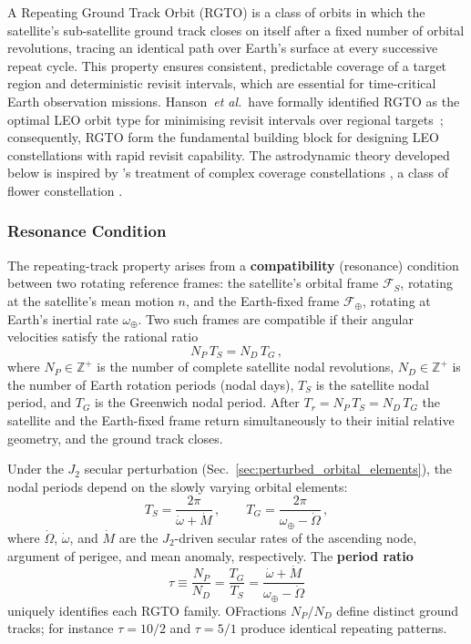 A Repeating Ground Track Orbit (RGTO) is a class of orbits in which the satellite's sub-satellite ground track closes on itself after a fixed number of orbital revolutions, tracing an identical path over Earth's surface at every successive repeat cycle.  This property ensures consistent, predictable coverage of a target region and deterministic revisit intervals, which are essential for time-critical Earth observation missions.  Hanson~\textit{et al.}\ have formally identified RGTO as the optimal LEO orbit type for minimising revisit intervals over regional targets~\cite{hansonDesigningGoodPartial1990}; consequently, RGTO form the fundamental building block for designing LEO constellations with rapid revisit capability.  The astrodynamic theory developed below is inspired by \citeauthor{lee_satellite_2020}'s treatment of complex coverage constellations \cite{lee_satellite_2020}, a class of flower constellation \cite{mortariFlowerConstellationSet2008}.

\subsubsection{Resonance Condition}
\label{sec:rgto_resonance_condition}

The repeating-track property arises from a \textbf{compatibility} (resonance) condition between two rotating reference frames: the satellite's orbital frame $\mathcal{F}_S$, rotating at the satellite's mean motion $n$, and the Earth-fixed frame $\mathcal{F}_{\oplus}$, rotating at Earth's inertial rate $\omega_{\oplus}$.  Two such frames are compatible if their angular velocities satisfy the rational ratio
\begin{equation}
    N_P \, T_S = N_D \, T_G \,,
    \label{eq:rgto_compatibility}
\end{equation}
where $N_P \in \mathbb{Z}^+$ is the number of complete satellite nodal revolutions, $N_D \in \mathbb{Z}^+$ is the number of Earth rotation periods (nodal days), $T_S$ is the satellite nodal period, and $T_G$ is the Greenwich nodal period.  After $T_r = N_P\,T_S = N_D\,T_G$ the satellite and the Earth-fixed frame return simultaneously to their initial relative geometry, and the ground track closes.

Under the $J_2$ secular perturbation (Sec.~\ref{sec:perturbed_orbital_elements}), the nodal periods depend on the slowly varying orbital elements:
\begin{equation}
    T_S = \frac{2\pi}{\dot{\omega} + \dot{M}}\,, \qquad
    T_G = \frac{2\pi}{\omega_{\oplus} - \dot{\Omega}}\,,
    \label{eq:rgto_nodal_periods}
\end{equation}
where $\dot{\Omega}$, $\dot{\omega}$, and $\dot{M}$ are the $J_2$-driven secular rates of the ascending node, argument of perigee, and mean anomaly, respectively.  The \textbf{period ratio}
\begin{equation}
    \tau \equiv \frac{N_P}{N_D} = \frac{T_G}{T_S}
    = \frac{\dot{\omega} + \dot{M}}{\omega_{\oplus} - \dot{\Omega}}
    \label{eq:rgto_period_ratio}
\end{equation}
uniquely identifies each RGTO family.  OFractions $N_P/N_D$ define distinct ground tracks; for instance $\tau = 10/2$ and $\tau = 5/1$ produce identical repeating patterns.

